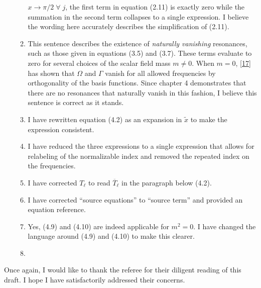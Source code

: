 \documentclass[11pt,letterpaper]{article}
\begin{document}
\begin{enumerate}
\begin{enumerate}
        ${x \to \pi/2 \; \forall \; j}$, the first term in equation (2.11) is exactly zero while the 
        summation in the second term collapses to a single expression. I believe the wording here 
        accurately describes the simplification of (2.11).
        \item This sentence describes the existence of \emph{naturally vanishing} resonances, such 
        as those given in equations (3.5) and (3.7). These terms evaluate to zero for several choices 
        of the scalar field mass $m \neq 0$. When $m = 0$, [\href{https://arxiv.org/pdf/1407.6273.pdf}{17}]
        has shown that $\Omega$ and $\Gamma$ vanish for all allowed frequencies by orthogonality of the 
        basis functions. Since chapter 4 demonstrates that there are no resonances that naturally 
        vanish in this fashion, I believe this sentence is correct as it stands.
        \item I have rewritten equation (4.2) as an expansion in $\tilde x$ to make the expression consistent.
        \item I have reduced the three expressions to a single expression that allows for relabeling of the normalizable index and removed the repeated index on the frequencies.
        \item I have corrected $T_\ell$ to read $\overline{T}_\ell$ in the paragraph below (4.2).
        \item I have corrected ``source equations'' to ``source term'' and provided an equation reference.
        \item Yes, (4.9) and (4.10) are indeed applicable for $m^2 = 0$. I have changed the language around (4.9) and (4.10) to make this clearer.
        \item
    \end{enumerate}   
\end{enumerate}

Once again, I would like to thank the referee for their diligent reading of this draft. I hope I have satisfactorily addressed their concerns. 
\end{document}
